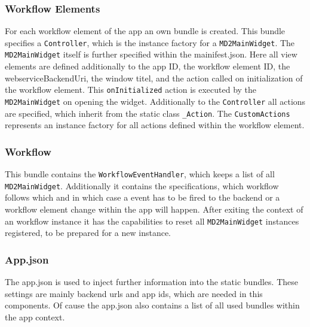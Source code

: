 \subsubsection{Workflow Elements}

For each workflow element of the app an own bundle is created. This bundle specifies a \lstinline|Controller|, which is the instance factory for a \lstinline|MD2MainWidget|. The \lstinline|MD2MainWidget| itself is further specified within the mainifest.json. Here all view elements are defined additionally to the app ID, the workflow element ID, the webserviceBackendUri, the window titel, and the action called on initialization of the workflow element. This \lstinline|onInitialized| action is executed by the \lstinline|MD2MainWidget| on opening the widget. Additionally to the \lstinline|Controller| all actions are specified, which inherit from the static class \lstinline|_Action|. The \lstinline|CustomActions| represents an instance factory for all actions defined within the workflow element.

\subsubsection{Workflow}
This bundle contains the \lstinline|WorkflowEventHandler|, which keeps a list of all  \lstinline|MD2MainWidget|. Additionally it contains the specifications, which workflow follows which and in which case a event has to be fired to the backend or a workflow element change within the app will happen. After exiting the context of an workflow instance it has the capabilities to reset all \lstinline|MD2MainWidget| instances registered, to be prepared for a new instance.

\subsubsection{App.json} \label{subsubsec:mapapps-generated-appjson}
The app.json is used to inject further information into the static bundles. These settings are mainly backend urls and app ids, which are needed in this components.
Of cause the app.json also contains a list of all used bundles within the app context.
